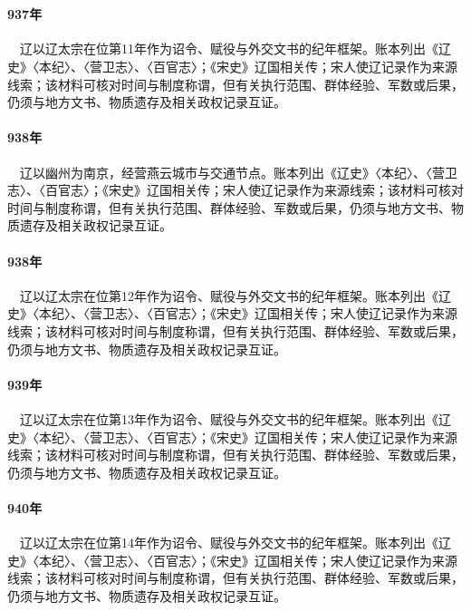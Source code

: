 \section{}

\paragraph{937年}　辽以辽太宗在位第11年作为诏令、赋役与外交文书的纪年框架。账本列出《辽史》〈本纪〉、〈营卫志〉、〈百官志〉；《宋史》辽国相关传；宋人使辽记录作为来源线索；该材料可核对时间与制度称谓，但有关执行范围、群体经验、军数或后果，仍须与地方文书、物质遗存及相关政权记录互证。

\paragraph{938年}　辽以幽州为南京，经营燕云城市与交通节点。账本列出《辽史》〈本纪〉、〈营卫志〉、〈百官志〉；《宋史》辽国相关传；宋人使辽记录作为来源线索；该材料可核对时间与制度称谓，但有关执行范围、群体经验、军数或后果，仍须与地方文书、物质遗存及相关政权记录互证。

\paragraph{938年}　辽以辽太宗在位第12年作为诏令、赋役与外交文书的纪年框架。账本列出《辽史》〈本纪〉、〈营卫志〉、〈百官志〉；《宋史》辽国相关传；宋人使辽记录作为来源线索；该材料可核对时间与制度称谓，但有关执行范围、群体经验、军数或后果，仍须与地方文书、物质遗存及相关政权记录互证。

\paragraph{939年}　辽以辽太宗在位第13年作为诏令、赋役与外交文书的纪年框架。账本列出《辽史》〈本纪〉、〈营卫志〉、〈百官志〉；《宋史》辽国相关传；宋人使辽记录作为来源线索；该材料可核对时间与制度称谓，但有关执行范围、群体经验、军数或后果，仍须与地方文书、物质遗存及相关政权记录互证。

\paragraph{940年}　辽以辽太宗在位第14年作为诏令、赋役与外交文书的纪年框架。账本列出《辽史》〈本纪〉、〈营卫志〉、〈百官志〉；《宋史》辽国相关传；宋人使辽记录作为来源线索；该材料可核对时间与制度称谓，但有关执行范围、群体经验、军数或后果，仍须与地方文书、物质遗存及相关政权记录互证。

